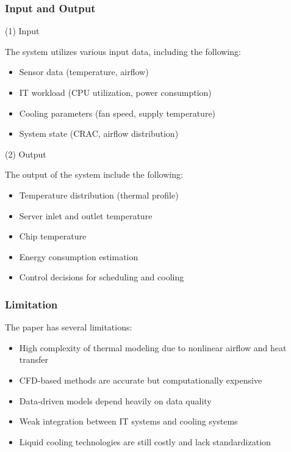 \documentclass[12pt,a4paper]{article}
\begin{document}
        \subsubsection{\textbf{ Input and Output}}

        (1) Input
        
                    The system utilizes various input data, including the following:                    
        \begin{itemize}
                \item Sensor data (temperature, airflow)
                \item IT workload (CPU utilization, power consumption)
                \item Cooling parameters (fan speed, supply temperature)
                \item System state (CRAC, airflow distribution)
        \end{itemize}

        (2) Output
        
                    The output of the system include the following:                   
        \begin{itemize}
            \item Temperature distribution (thermal profile)
            \item Server inlet and outlet temperature
            \item Chip temperature
            \item Energy consumption estimation
            \item Control decisions for scheduling and cooling
        \end{itemize}
        
        \subsubsection{\textbf{ Limitation}}

                     The paper has several limitations:      
                \begin{itemize}
                    \item High complexity of thermal modeling due to nonlinear airflow and heat transfer
                \end{itemize}
                \begin{itemize}
                    \item CFD-based methods are accurate but computationally expensive
                    \item Data-driven models depend heavily on data quality
                    \item Weak integration between IT systems and cooling systems
                    \item Liquid cooling technologies are still costly and lack standardization
                \end{itemize}
          
\end{document}
